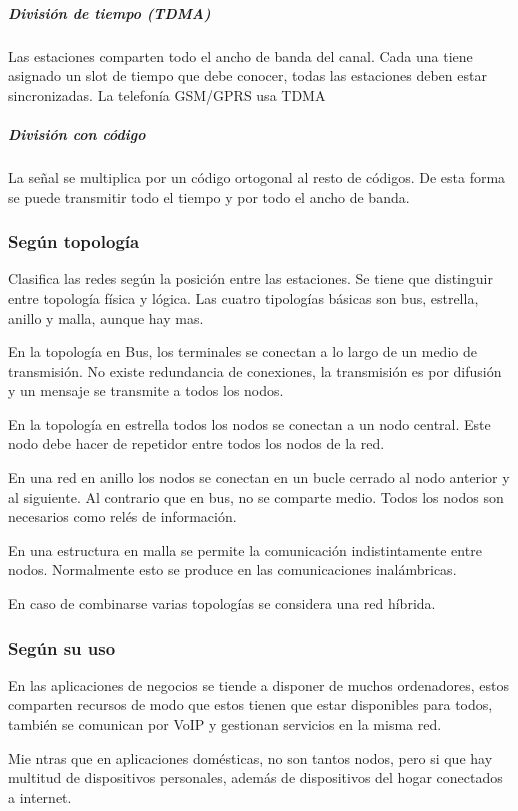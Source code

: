             \subparagraph{División de tiempo (TDMA)}
                Las estaciones comparten todo el ancho de banda del canal. Cada una tiene asignado un slot de tiempo que debe conocer, todas las estaciones deben estar sincronizadas. La telefonía GSM/GPRS usa TDMA

            \subparagraph{División con código}
                La señal se multiplica por un código ortogonal al resto de códigos. De esta forma se puede transmitir todo el tiempo y por todo el ancho de banda.

    \subsubsection{Según topología} %
        Clasifica las redes según la posición entre las estaciones. Se tiene que distinguir entre topología física y lógica. Las cuatro tipologías básicas son bus, estrella, anillo y malla, aunque hay mas.

        En la topología en Bus, los terminales se conectan a lo largo de un medio de transmisión. No existe redundancia de conexiones, la transmisión es por difusión y un mensaje se transmite a todos los nodos.

        En la topología en estrella todos los nodos se conectan a un nodo central. Este nodo debe hacer de repetidor entre todos los nodos de la red.

        En una red en anillo los nodos se conectan en un bucle cerrado al nodo anterior y al siguiente. Al contrario que en bus, no se comparte medio. Todos los nodos son necesarios como relés de información.

        En una estructura en malla se permite la comunicación indistintamente entre nodos. Normalmente esto se produce en las comunicaciones inalámbricas.

        En caso de combinarse varias topologías se considera una red híbrida.

    \subsubsection{Según su uso} %
        En las aplicaciones de negocios se tiende a disponer de muchos ordenadores, estos comparten recursos de modo que estos tienen que estar disponibles para todos, también se comunican por VoIP y gestionan servicios en la misma red.

        Mie ntras que en aplicaciones domésticas, no son tantos nodos, pero si que hay multitud de dispositivos personales, además de dispositivos del hogar conectados a internet.

